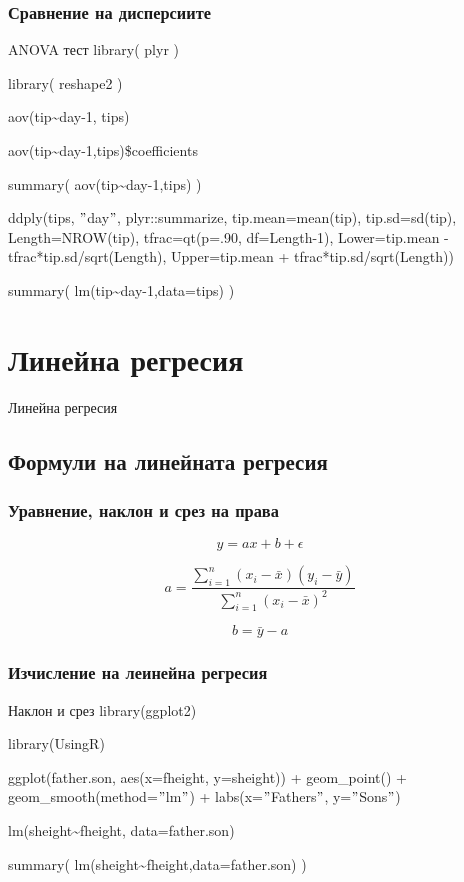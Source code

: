 \documentclass{beamer}
\begin{document}
\begin{frame}
\frametitle{Сравнение на дисперсиите}
\begin{block}{ANOVA тест}
library( plyr )

library( reshape2 )

aov(tip\textasciitilde day-1, tips)

aov(tip\textasciitilde day-1,tips)\$coefficients

summary( aov(tip\textasciitilde day-1,tips) )

ddply(tips, $"$day$"$, plyr::summarize, tip.mean=mean(tip), tip.sd=sd(tip), Length=NROW(tip), tfrac=qt(p=.90, df=Length-1), Lower=tip.mean - tfrac*tip.sd/sqrt(Length), Upper=tip.mean + tfrac*tip.sd/sqrt(Length))

summary( lm(tip\textasciitilde day-1,data=tips) )
\end{block}
\end{frame}

\section{Линейна регресия}

\begin{frame}
\center \huge{Линейна регресия}
\end{frame}

\subsection{Формули на линейната регресия}

\begin{frame}
\frametitle{Уравнение, наклон и срез на права}
\begin{equation}
y = ax + b + \epsilon
\end{equation}

\begin{equation}
a = \frac{ \sum_{i=1}^{n}(x_i-\bar{x})(y_i-\bar{y}) }{ \sum_{i=1}^{n}(x_i-\bar{x})^2 }
\end{equation}

\begin{equation}
b = \bar{y} - a
\end{equation}
\end{frame}

\begin{frame}
\frametitle{Изчисление на леинейна регресия}
\begin{block}{Наклон и срез}
library(ggplot2)

library(UsingR)

ggplot(father.son, aes(x=fheight, y=sheight)) + geom\_point() + geom\_smooth(method=$"$lm$"$) + labs(x=$"$Fathers$"$, y=$"$Sons$"$)

lm(sheight\textasciitilde fheight, data=father.son)

summary( lm(sheight\textasciitilde fheight,data=father.son) )
\end{block}
\end{frame}
\end{document}
